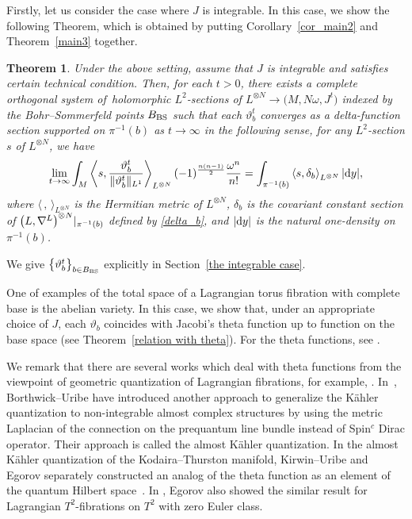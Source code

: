 \documentclass[pdftex]{sigma}
\numberwithin{equation}{section}
\newtheorem{Theorem}{Theorem}[section]
\newcommand{\abs}[1]{\lvert#1\rvert}
\newcommand{\norm}[1]{\lVert#1\rVert}
\begin{document}
Firstly, let us consider the case where $J$ is integrable. In this case, we show the following Theorem, which is obtained by putting Corollary~\ref{cor_main2} and Theorem~\ref{main3} together.
\begin{Theorem}\label{main integrable case}
Under the above setting, assume that $J$ is integrable and satisfies certain technical condition. Then, for each $t>0$, %
there exists a complete orthogonal system  of~holomorphic $L^2$-sections of $L^{\otimes N}\to \bigl(M,N\omega ,J^t\bigr)$ indexed by the Bohr--Sommerfeld points $B_{\rm BS}$ such that each $\vartheta^t_b$ converges as a delta-function section supported on $\pi^{-1}(b)$ as $t\to \infty$ in the following sense, for any $L^2$-section $s$ of $L^{\otimes N}$, we have
\begin{equation*}
\lim_{t\to \infty}\int_M\left\langle s, \frac{\vartheta^t_b}{\norm{\vartheta^t_b}_{L^1}} \right\rangle_{L^{\otimes N}} (-1)^{\frac{n(n-1)}{2}}\dfrac{\omega^n}{n!}=\int_{\pi^{-1}(b)}\left\langle s,\delta_b\right\rangle_{L^{\otimes N}} \abs{{\rm d}y},
\end{equation*}
where $\langle \, ,\, \rangle_{L^{\otimes N}}$ is the Hermitian metric of $L^{\otimes N}$, $\delta_b$ is the covariant constant section of \linebreak $\bigl(L, \smash{\nabla^L\bigr)^{\otimes N}|_{\pi^{-1}(b)}}$
defined by \eqref{delta_b}, and $\abs{{\rm d}y}$ is the natural one-density on $\pi^{-1}(b)$.
\end{Theorem}
We give $\big\{\vartheta^t_b\big\}_{b\in B_{\rm BS}}$ explicitly in Section~\ref{the integrable case}.

One of examples of the total space of a Lagrangian torus fibration with complete base is the abelian variety. In this case, we show that, under an appropriate choice of $J$, each $\vartheta_b$ coincides with Jacobi's theta function up to function on the base space (see Theorem~\ref{relation with theta}). For the theta functions, see \cite{Mumford1,Mumford3}.

We remark that there are several works which deal with theta functions from the viewpoint of geometric quantization of Lagrangian fibrations, for example, \cite{BMN,Mumford3,Nohara1, Nohara2}. In~\cite{BU}, Borthwick--Uribe have introduced another approach to generalize the K\"ahler quantization to non-integrable almost complex structures by using the metric Laplacian of the connection on the prequantum line bundle instead of Spin${}^c$ Dirac operator. Their approach is called the almost K\"ahler quantization. In the almost K\"ahler quantization of the Kodaira--Thurston manifold, Kirwin--Uribe and Egorov separately constructed an analog of the theta function as an element of the quantum Hilbert space~\cite{Egorov2,Kirwin--Uribe}. In \cite{Egorov1}, Egorov also showed the similar result for Lagrangian $T^2$-fibrations on $T^2$ with zero Euler class.
\end{document}
